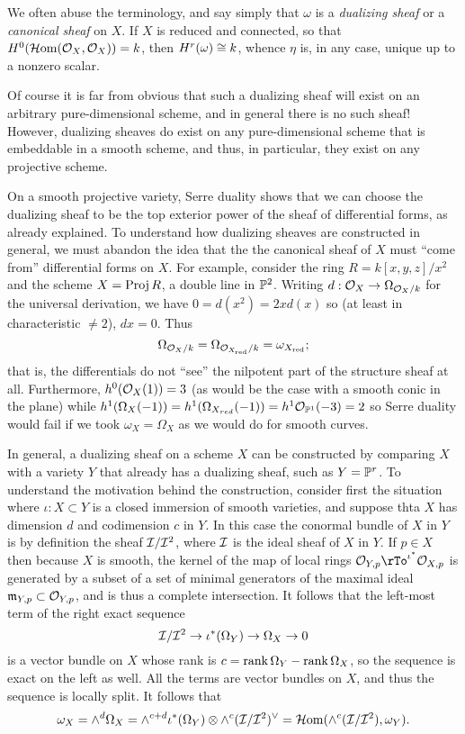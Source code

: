 We often abuse the terminology, and say simply that $\omega$ is a \emph{dualizing sheaf} or a \emph {canonical sheaf} on $X$. If $X$ is reduced and connected, so that $\HH^{0} (\sHom(\sO_{X} , \sO_{X})) = k$, then
$\HH^{r}(\omega) \cong k$, whence $\eta$ is, in any case, unique up to a nonzero scalar. 

Of course it is far from obvious that such a dualizing sheaf will exist on an arbitrary pure-dimensional scheme, and in general there is no such sheaf! However, dualizing sheaves do exist on any pure-dimensional scheme that is embeddable in a smooth scheme, and thus, in particular, they exist on any projective scheme.

On a smooth projective variety, Serre duality shows that we can choose the dualizing sheaf to be the top exterior power of the sheaf of differential forms, as already explained. To understand how dualizing sheaves are constructed in general, we must abandon the idea that the the canonical sheaf of $X$ must ``come from'' differential forms on $X$. For example, consider the ring $R = k[x,y,z]/x^{2}$ and the scheme $X = \Proj R$, a double line in $\PP^{2}$. Writing $d: \sO_{X}\to \Omega_{\sO_{X}/k}$ for the universal derivation, we have $0 = d(x^{2}) = 2xd(x)$ so (at least in characteristic $\neq 2$), $dx = 0$. Thus 
\def\red{{\rm red}}
$$
\Omega_{\sO_{X}/k} = \Omega_{\sO_{X_{\red}}/k} = \omega_{X_{\red}};
$$ 
that is, the differentials do not ``see'' the nilpotent part of the structure sheaf at all. Furthermore, 
$
h^{0}(\sO_{X}(1)) = 3
$
(as would be the case with a smooth conic in the plane)
while 
$
h^{1}(\Omega_{X} (-1)) = h^{1}(\Omega_{X_{red}} (-1)) = h^{1}\sO_{\PP^{1}}(-3) = 2
$
so Serre duality would fail if we took $\omega_{X} = \Omega_{X}$ as we would do for smooth curves.

In general, a dualizing sheaf on a scheme $X$ can be constructed by comparing $X$ with a 
variety $Y$ that already has a dualizing sheaf, such as $Y=\PP^{r}$. To understand the motivation behind the construction, 
consider first the situation where $\iota: X\subset Y$ is a closed immersion of smooth varieties, and suppose thta $X$ has dimension $d$ and codimension $c$ in $Y$.
In this case the conormal bundle of $X$ in $Y$ is by definition the sheaf
$\cI/\cI^{2}$, where $\cI$ is the ideal sheaf of $X$ in $Y$. If $p\in X$ then because $X$ is smooth, the kernel of the map of local rings $\cO_{Y,p} \rTo^{\iota^{*}} \cO_{X,p}$ is generated by a subset of a set of minimal generators of the maximal ideal $\gm_{Y,p}\subset \cO_{Y,p}$, and is thus a complete intersection. It follows that the left-most term of the right exact sequence
$$
\cI/\cI^{2} \to \iota^{*}(\Omega_{Y}) \to\Omega_{X} \to 0
$$
is a vector bundle on $X$ whose rank is  $c = \rank \Omega_{Y} -\rank \Omega_{X}$, so the sequence is exact on the left as well. All the terms are vector bundles on $X$, and thus the sequence
is locally split. It follows that 
$$
\omega_X = \wedge^{d}\Omega_{X} = \wedge^{c+d} \iota^{*}(\Omega_{Y})\otimes \wedge^{c}(\cI/\cI^{2})^{\vee} = \sHom(\wedge^{c}(\cI/\cI^{2}), \omega_{Y}).
$$ 

